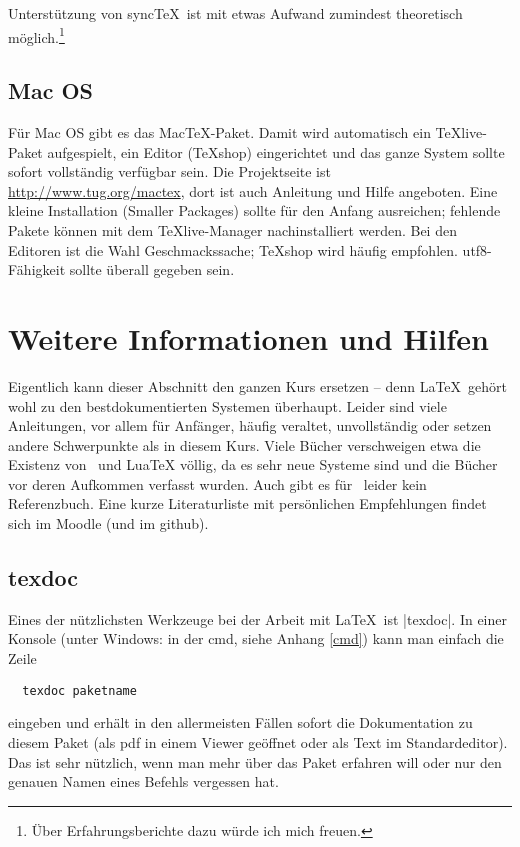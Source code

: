 \documentclass[12pt,ngerman]{scrartcl}
\newcommand{\TeXlive}{\TeX\textsf{live}\xspace}
\newcommand{\luaTeX}{\textsf{Lua}\TeX\xspace}
\begin{document}
Unterstützung von sync\TeX\ ist mit etwas Aufwand zumindest theoretisch möglich.\footnote{Über Erfahrungsberichte dazu würde ich mich freuen.}

\subsection{Mac OS}
Für Mac OS gibt es das Mac\TeX-Paket. Damit wird automatisch ein \TeXlive-Paket aufgespielt, ein Editor (\TeX shop) eingerichtet und das ganze System sollte sofort vollständig verfügbar sein. Die Projektseite ist \url{http://www.tug.org/mactex}, dort ist auch Anleitung und Hilfe angeboten. Eine kleine Installation (\textsf{Smaller Packages}) sollte für den Anfang ausreichen; fehlende Pakete können mit dem \TeXlive-Manager nachinstalliert werden. Bei den Editoren ist die Wahl Geschmackssache; \TeX shop wird häufig empfohlen. utf8-Fähigkeit sollte überall gegeben sein.

\newpage
\section{Weitere Informationen und Hilfen}
Eigentlich kann dieser Abschnitt den ganzen Kurs ersetzen – denn \LaTeX\ gehört wohl zu den bestdokumentierten Systemen überhaupt. Leider sind viele Anleitungen, vor allem für Anfänger, häufig veraltet, unvollständig oder setzen andere Schwerpunkte als in diesem Kurs. Viele Bücher verschweigen etwa die Existenz von \XeTeX\ und \luaTeX völlig, da es sehr neue Systeme sind und die Bücher vor deren Aufkommen verfasst wurden. Auch gibt es für \ConTeXt\ leider kein Referenzbuch. Eine kurze Literaturliste mit persönlichen Empfehlungen findet sich im Moodle (und im github).

\subsection{texdoc}
Eines der nützlichsten Werkzeuge bei der Arbeit mit \LaTeX\ ist |texdoc|. In einer Konsole (unter Windows: in der cmd, siehe Anhang \ref{cmd}) kann man einfach die Zeile
\begin{verbatim}
  texdoc paketname
\end{verbatim}
eingeben und erhält in den allermeisten Fällen sofort die Dokumentation zu diesem Paket (als pdf in einem Viewer geöffnet oder als Text im Standardeditor). Das ist sehr nützlich, wenn man mehr über das Paket erfahren will oder nur den genauen Namen eines Befehls vergessen hat.
\end{document}
